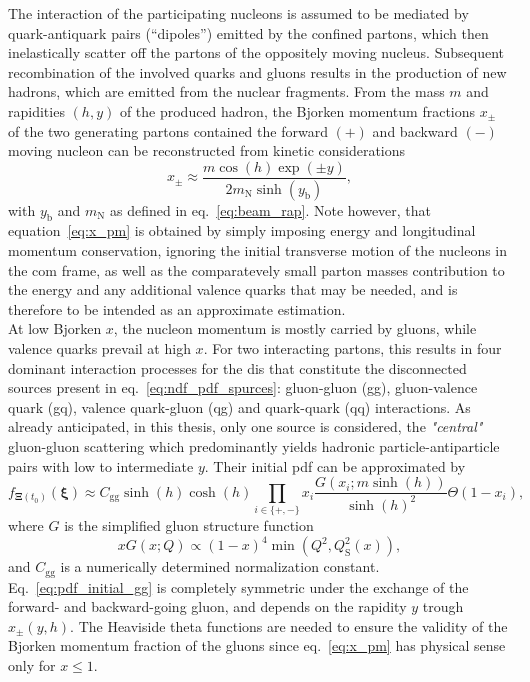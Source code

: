 \documentclass[a4paper,12pt]{book}
\begin{document}
The interaction of the participating nucleons is assumed to be mediated by quark-antiquark pairs (“dipoles”) emitted by the confined partons, which then inelastically scatter off the partons of the oppositely moving nucleus. Subsequent recombination of the involved quarks and gluons results in the production of new hadrons, which are emitted from the nuclear fragments. From the mass $m$ and rapidities $(h,y)$ of the produced hadron, the Bjorken momentum fractions $x_\pm$ of the two generating partons contained the forward $(+)$  and backward $(-)$ moving nucleon can be reconstructed from kinetic considerations
\begin{equation}
\label{eq:x_pm}
    x_\pm \approx \frac{m \cos(h) \exp(\pm y)}{2 m_\text{N} \sinh(y_\text{b})},
\end{equation}
with $y_\text{b}$ and $m_\text{N}$ as defined in eq.~\eqref{eq:beam_rap}. Note however, that equation~\eqref{eq:x_pm} is obtained by simply imposing energy and longitudinal momentum conservation, ignoring the initial transverse motion of the nucleons in the \acrshort{com} frame, as well as the comparatevely small parton masses contribution to the energy and any additional valence quarks that may be needed, and is therefore to be intended as an approximate estimation. \\


At low Bjorken $x$, the nucleon momentum is mostly carried by gluons, while valence quarks prevail at high $x$. For two interacting partons, this results in four dominant interaction processes for the \acrshort{dis} that constitute the disconnected sources present in eq.~\eqref{eq:ndf_pdf_spurces}: gluon-gluon (gg), gluon-valence quark (gq), valence quark-gluon (qg) and quark-quark (qq) interactions. As already anticipated, in this thesis, only one source is considered, the \textit{"central"} gluon-gluon scattering which predominantly yields hadronic particle-antiparticle pairs with low to intermediate $y$. Their initial \acrshort{pdf} can be approximated by~\parencite{KHARZEEV2005}
\begin{equation}
    \label{eq:pdf_initial_gg}
    f_{\bm{\Xi}(t_0)}(\bm{\xi}) \approx C_{\mathrm{gg}} \sinh (h) \cosh (h) \prod_{i \in\{+,-\}} x_i \frac{G\left(x_i ; m \sinh (h)\right)}{\sinh (h)^2} \Theta(1-x_i),
\end{equation}
where $G$ is the simplified gluon structure function
\begin{equation}
    x G(x ; Q) \propto(1-x)^4 \min \left(Q^2, Q_{\text{S}}^2(x)\right),
\end{equation}
and $C_{\mathrm{gg}}$ is a numerically determined normalization constant. Eq.~\eqref{eq:pdf_initial_gg} is completely symmetric under the exchange of the forward- and backward-going gluon, and depends on the rapidity $y$ trough $x_\pm(y,h)$. The Heaviside theta functions are needed to ensure the validity of the Bjorken momentum fraction of the gluons since eq.~\eqref{eq:x_pm} has physical sense only for $x \leq 1$.
\end{document}
